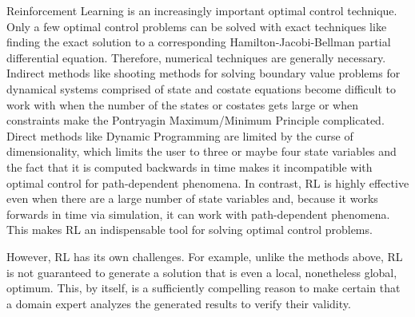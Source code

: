 \documentclass[mnsc,sglanonrev]{informs4}
\begin{document}
Reinforcement Learning is an increasingly important optimal control technique. Only a few optimal control problems can be solved with exact techniques like finding the exact solution to a corresponding Hamilton-Jacobi-Bellman partial differential equation. Therefore, numerical techniques are generally necessary. Indirect methods like shooting methods for solving boundary value problems for dynamical systems comprised of state and costate equations become difficult to work with when the number of the states or costates gets large or when constraints make the Pontryagin Maximum/Minimum Principle complicated. Direct methods like Dynamic Programming are limited by the curse of dimensionality, which limits the user to three or maybe four state variables and the fact that it is computed backwards in time makes it incompatible with optimal control for path-dependent phenomena. In contrast, RL is highly effective even when there are a large number of state variables and, because it works forwards in time via simulation, it can work with path-dependent phenomena. This makes RL an indispensable tool for solving optimal control problems.

However, RL has its own challenges. For example, unlike the methods above, RL is not guaranteed to generate a solution that is even a local, nonetheless global, optimum. This, by itself, is a sufficiently compelling reason to make certain that a domain expert analyzes the generated results to verify their validity. 


\end{document}
